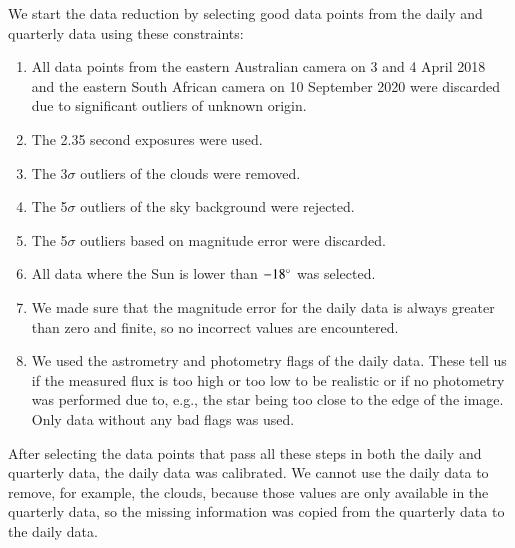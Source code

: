 \documentclass{aa}
\begin{document}
We start the data reduction by selecting good data points from the daily and quarterly data using these constraints:

\begin{enumerate}
    \item All data points from the eastern Australian camera on 3 and 4 April 2018 and the eastern South African camera on 10 September 2020 were discarded due to significant outliers of unknown origin.
    \item The 2.35 second exposures were used.
    \item The 3$\sigma$ outliers of the clouds were removed. %
    \item The 5$\sigma$ outliers of the sky background were rejected. %
    \item The 5$\sigma$ outliers based on magnitude error were discarded. %
    \item All data where the Sun is lower than $-18^\circ$ was selected. %
    \item We made sure that the magnitude error for the daily data is always greater than zero and finite, so no incorrect values are encountered. 
    \item We used the astrometry and photometry flags of the daily data. 
    These tell us if the measured flux is too high or too low to be realistic or if no photometry was performed due to, e.g., the star being too close to the edge of the image.
    Only data without any bad flags was used. 
\end{enumerate}

After selecting the data points that pass all these steps in both the daily and quarterly data, the daily data was calibrated.
%
We cannot use the daily data to remove, for example, the clouds, because those values are only available in the quarterly data, so the missing information was copied from the quarterly data to the daily data. 
\end{document}
